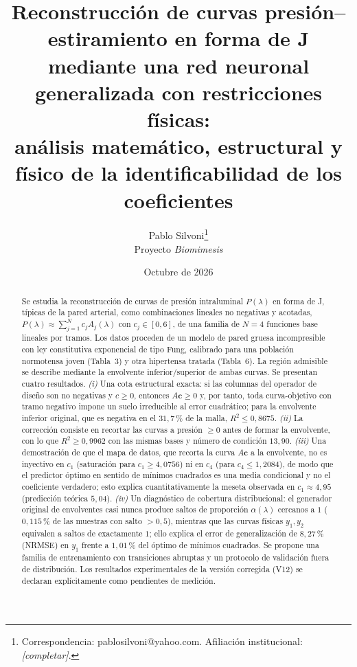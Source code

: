 \documentclass[11pt,twoside]{article}
\title{\textbf{Reconstrucción de curvas presión--estiramiento en forma de J mediante una red neuronal generalizada con restricciones físicas:\\ análisis matemático, estructural y físico de la identificabilidad de los coeficientes}}
\author{Pablo Silvoni\thanks{Correspondencia: pablosilvoni@yahoo.com. Afiliación institucional: \emph{[completar]}.}\\[2pt]\small Proyecto \emph{Biomimesis}}
\date{Octubre de 2026}
\theoremstyle{definition}
\theoremstyle{remark}
\begin{document}
\maketitle

\begin{abstract}
Se estudia la reconstrucción de curvas de presión intraluminal $P(\lambda)$ en forma de J, típicas de la pared arterial, como combinaciones lineales no negativas y acotadas, $P(\lambda)\approx\sum_{j=1}^{N}c_j A_j(\lambda)$ con $c_j\in[0,6]$, de una familia de $N=4$ funciones base lineales por tramos. Los datos proceden de un modelo de pared gruesa incompresible con ley constitutiva exponencial de tipo Fung, calibrado para una población normotensa joven (Tabla~3) y otra hipertensa tratada (Tabla~6). La región admisible se describe mediante la envolvente inferior/superior de ambas curvas. Se presentan cuatro resultados. \emph{(i)} Una cota estructural exacta: si las columnas del operador de diseño son no negativas y $c\ge 0$, entonces $A\bm c\ge 0$ y, por tanto, toda curva-objetivo con tramo negativo impone un suelo irreducible al error cuadrático; para la envolvente inferior original, que es negativa en el $31{,}7\,\%$ de la malla, $R^2\le 0{,}8675$. \emph{(ii)} La corrección consiste en recortar las curvas a presión $\ge 0$ antes de formar la envolvente, con lo que $R^2\ge 0{,}9962$ con las mismas bases y número de condición $13{,}90$. \emph{(iii)} Una demostración de que el mapa de datos, que recorta la curva $A\bm c$ a la envolvente, no es inyectivo en $c_1$ (saturación para $c_1\ge 4{,}0756$) ni en $c_4$ (para $c_4\le 1{,}2084$), de modo que el predictor óptimo en sentido de mínimos cuadrados es una media condicional y no el coeficiente verdadero; esto explica cuantitativamente la meseta observada en $c_1\approx 4{,}95$ (predicción teórica $5{,}04$). \emph{(iv)} Un diagnóstico de cobertura distribucional: el generador original de envolventes casi nunca produce saltos de proporción $\alpha(\lambda)$ cercanos a $1$ ($0{,}115\,\%$ de las muestras con salto $>0{,}5$), mientras que las curvas físicas $y_1,y_2$ equivalen a saltos de exactamente $1$; ello explica el error de generalización de $8{,}27\,\%$ (NRMSE) en $y_1$ frente a $1{,}01\,\%$ del óptimo de mínimos cuadrados. Se propone una familia de entrenamiento con transiciones abruptas y un protocolo de validación fuera de distribución. Los resultados experimentales de la versión corregida (V12) se declaran explícitamente como pendientes de medición.
\end{abstract}
\end{document}
